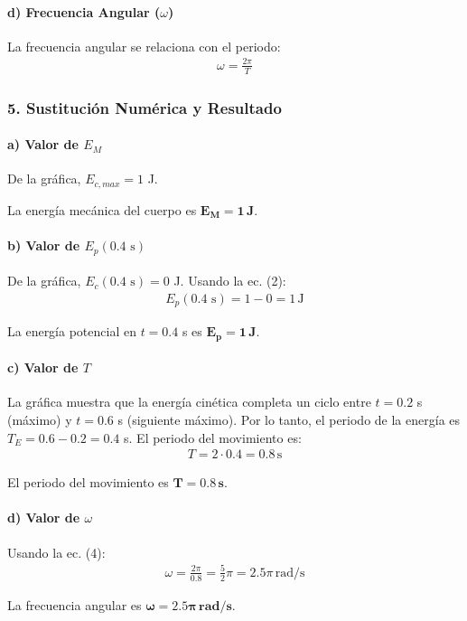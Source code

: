 \paragraph*{d) Frecuencia Angular ($\omega$)}
La frecuencia angular se relaciona con el periodo:
\begin{gather}
    \omega = \frac{2\pi}{T}
\end{gather}

\subsubsection*{5. Sustitución Numérica y Resultado}
\paragraph*{a) Valor de $E_M$}
De la gráfica, $E_{c,max} = 1$ J.
\begin{cajaresultado}
    La energía mecánica del cuerpo es $\boldsymbol{E_M = 1 \, \textbf{J}}$.
\end{cajaresultado}

\paragraph*{b) Valor de $E_p(0.4\text{ s})$}
De la gráfica, $E_c(0.4\text{ s}) = 0$ J. Usando la ec. (2):
\begin{gather}
    E_p(0.4\text{ s}) = 1 - 0 = 1 \, \text{J}
\end{gather}
\begin{cajaresultado}
    La energía potencial en $t=0.4$ s es $\boldsymbol{E_p = 1 \, \textbf{J}}$.
\end{cajaresultado}

\paragraph*{c) Valor de $T$}
La gráfica muestra que la energía cinética completa un ciclo entre $t=0.2$ s (máximo) y $t=0.6$ s (siguiente máximo). Por lo tanto, el periodo de la energía es $T_E = 0.6 - 0.2 = 0.4$ s. El periodo del movimiento es:
\begin{gather}
    T = 2 \cdot 0.4 = 0.8 \, \text{s}
\end{gather}
\begin{cajaresultado}
    El periodo del movimiento es $\boldsymbol{T = 0.8 \, \textbf{s}}$.
\end{cajaresultado}

\paragraph*{d) Valor de $\omega$}
Usando la ec. (4):
\begin{gather}
    \omega = \frac{2\pi}{0.8} = \frac{5}{2}\pi = 2.5\pi \, \text{rad/s}
\end{gather}
\begin{cajaresultado}
    La frecuencia angular es $\boldsymbol{\omega = 2.5\pi \, \textbf{rad/s}}$.
\end{cajaresultado}

